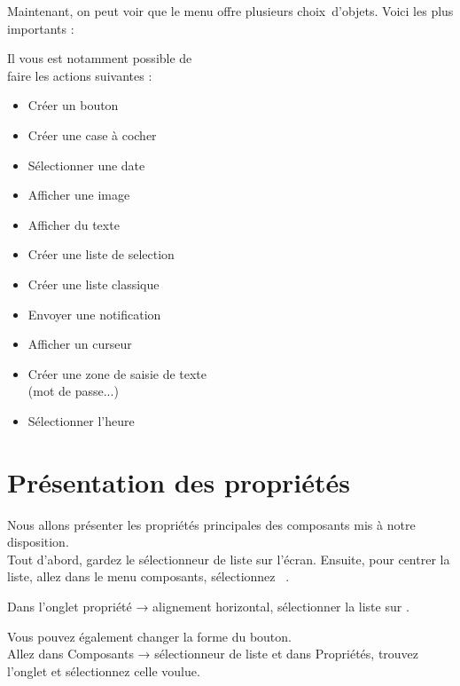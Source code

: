 Maintenant, on peut voir que le menu offre plusieurs choix d'objets. Voici les plus importants :

\begin{minipage}{.6\textwidth}%

Il vous est notamment possible de \\faire les actions suivantes :

\begin{itemize}
    \item Créer un bouton
    \item Créer une case à cocher
    \item Sélectionner une date
    \item Afficher une image
    \item Afficher du texte
    \item Créer une liste de selection
    \item Créer une liste classique
    \item Envoyer une notification
    \item Afficher un curseur
    \item Créer une zone de saisie de texte \\(mot de passe...)
    \item Sélectionner l'heure
\end{itemize}

\end{minipage}%
\hfill
\begin{minipage}{.35\textwidth}%
\end{minipage}%

\section{Présentation des propriétés}

Nous allons présenter les propriétés principales des composants mis à notre disposition. \\
\noindent
Tout d'abord, gardez le {\color{orange}sélectionneur de liste} sur l'{\color{blue}écran}.
Ensuite, pour centrer la liste, allez dans le menu {\color{gray}composants}, sélectionnez  .

Dans l'onglet {\color{green}propriété} → alignement horizontal, sélectionner la liste sur . 


Vous pouvez également changer la forme du bouton. \\
Allez dans {\color{gray}Composants} → sélectionneur de liste et dans {\color{green}Propriétés}, trouvez l'onglet  
et sélectionnez celle voulue.    

